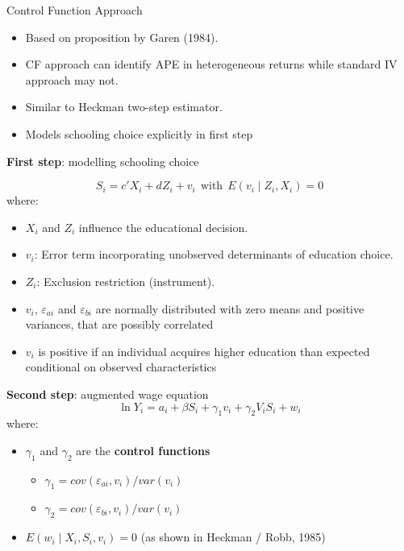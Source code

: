 \documentclass[10pt,ignorenonframetext,]{beamer}
\providecommand{\tightlist}{%
  \setlength{\itemsep}{0pt}\setlength{\parskip}{0pt}}
\begin{document}
\begin{frame}[allowframebreaks]{Control Function Approach}
\protect\hypertarget{control-function-approach}{}

\begin{itemize}
\tightlist
\item
  Based on proposition by Garen (1984).
\item
  CF approach can identify APE in heterogeneous returns while standard
  IV approach may not.
\item
  Similar to Heckman two-step estimator.
\item
  Models schooling choice explicitly in first step
\end{itemize}

\textbf{First step}: modelling schooling choice

\[S_i = c'X_i + dZ_i + v_i ~~\text{with}~~ E(v_i \mid Z_i, X_i) = 0\]
where:

\begin{itemize}
\item
  \(X_i\) and \(Z_i\) influence the educational decision.
\item
  \(v_i\): Error term incorporating unobserved determinants of education
  choice.
\item
  \(Z_i\): Exclusion restriction (instrument).
\item
  \(v_i\), \(\varepsilon_{ai}\) and \(\varepsilon_{bi}\) are normally
  distributed with zero means and positive variances, that are possibly
  correlated
\item
  \(v_i\) is positive if an individual acquires higher education than
  expected conditional on observed characteristics
\end{itemize}

\textbf{Second step}: augmented wage equation
\[\ln Y_i = a_i + \beta S_i + \gamma_1 v_i + \gamma_2 V_iS_i + w_i
\] where:

\begin{itemize}
\item
  \(\gamma_1\) and \(\gamma_2\) are the \textbf{control functions}

  \begin{itemize}
  \item
    \(\gamma_1 = cov(\varepsilon_{ai}, v_i) /var(v_i)\)
  \item
    \(\gamma_2 = cov(\varepsilon_{bi}, v_i) /var(v_i)\)
  \end{itemize}
\item
  \(E(w_i \mid X_i, S_i, v_i) = 0\) (as shown in Heckman / Robb, 1985)
\end{itemize}

\end{frame}
\end{document}
